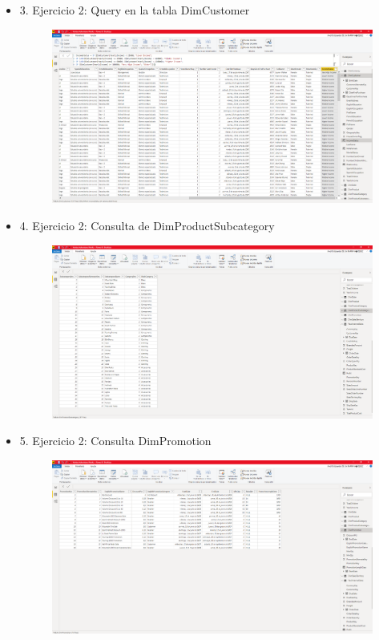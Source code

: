 \begin{itemize}
	\item3. Ejercicio 2: Query en la tabla DimCustomer
		\begin{figure}[H]
		\begin{center}
		\includegraphics[width=18cm]{./Imagenes/imagen3}
		\end{center}
		\end{figure}
     
	\item 4. Ejercicio 2: Consulta de DimProductSubcategory
		\begin{figure}[H]
		\begin{center}
		\includegraphics[width=18cm]{./Imagenes/imagen4}
		\end{center}
		\end{figure}
     
	\item 5. Ejercicio 2: Consulta DimPromotion
		\begin{figure}[H]
		\begin{center}
		\includegraphics[width=18cm]{./Imagenes/imagen5}
		\end{center}
		\end{figure}
     

\end{itemize}
